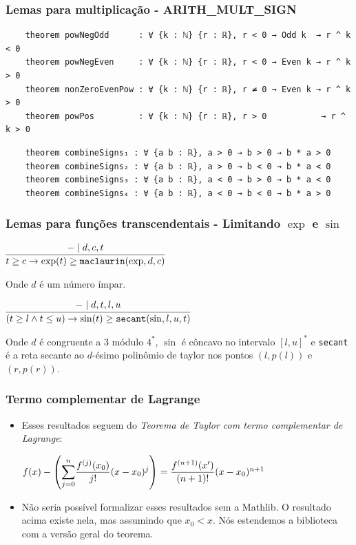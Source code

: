 \documentclass[usepdftitle=false,aspectratio=169,usenames,dvipsnames]{beamer}
\newcommand\vitem{\vfill\item}
\begin{document}
\begin{frame}[fragile]
  \frametitle{Lemas para multiplicação - ARITH\_MULT\_SIGN}

  \begin{lstlisting}
    theorem powNegOdd      : ∀ {k : ℕ} {r : ℝ}, r < 0 → Odd k  → r ^ k < 0
    theorem powNegEven     : ∀ {k : ℕ} {r : ℝ}, r < 0 → Even k → r ^ k > 0
    theorem nonZeroEvenPow : ∀ {k : ℕ} {r : ℝ}, r ≠ 0 → Even k → r ^ k > 0
    theorem powPos         : ∀ {k : ℕ} {r : ℝ}, r > 0           → r ^ k > 0
  \end{lstlisting}

  \begin{lstlisting}
    theorem combineSigns₁ : ∀ {a b : ℝ}, a > 0 → b > 0 → b * a > 0
    theorem combineSigns₂ : ∀ {a b : ℝ}, a > 0 → b < 0 → b * a < 0
    theorem combineSigns₃ : ∀ {a b : ℝ}, a < 0 → b > 0 → b * a < 0
    theorem combineSigns₄ : ∀ {a b : ℝ}, a < 0 → b < 0 → b * a > 0
  \end{lstlisting}
\end{frame}

\begin{frame}[fragile]
  \frametitle{Lemas para funções transcendentais - Limitando $\exp$ e $\sin$}
\begin{center}
$\infer[]{t \geq c \rightarrow \exp(t) \geq \texttt{maclaurin}(\exp, d, c)}{- \mid d,c,t}$
\end{center}

Onde $d$ é um número ímpar.

\begin{center}
  $\infer[]{(t \geq l \wedge t \le u) \rightarrow
  \sin(t) \geq \texttt{secant}(\sin, l, u, t)}{- \mid d,t,l,u}$
\end{center}

Onde $d$ é congruente a $3$ módulo $4^{*}$, $\sin$ é côncavo no intervalo $[l, u]^{*}$ e \texttt{secant} é a reta secante ao $d$-ésimo polinômio de taylor nos pontos $(l, p(l))$ e $(r, p(r))$.

\end{frame}

\begin{frame}
  \frametitle{Termo complementar de Lagrange}
  \begin{itemize}
    \item Esses resultados seguem do \textit{Teorema de Taylor com termo complementar de Lagrange}:

    \vfill
    \begin{center}
      $f(x) - \left( \mathlarger{\sum_{j=0}^{n}}\dfrac{f^{(j)}(x_0)}{j!}(x - x_0)^j \right) = \dfrac{f^{(n+1)}(x')}{(n+1)!}(x - x_0)^{n+1}$
    \end{center}
    \vitem Não seria possível formalizar esses resultados sem a Mathlib. O resultado acima existe nela, mas assumindo que $x_{0} < x$. Nós estendemos a biblioteca com a versão geral do teorema.
  \end{itemize}
\end{frame}
\end{document}

